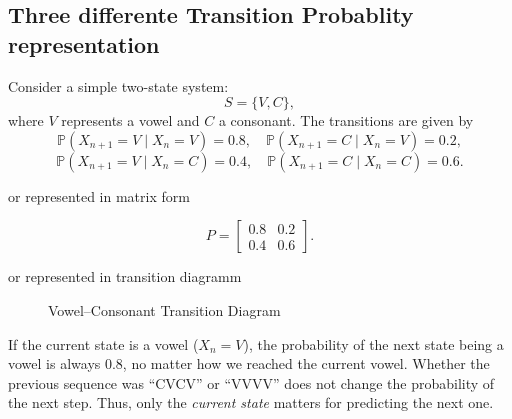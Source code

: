 \subsection{Three differente Transition Probablity representation}

Consider a simple two-state system:
\[
S = \{V, C\},
\]
where $V$ represents a vowel and $C$ a consonant. The transitions are given by
\[
\mathbb{P}(X_{n+1}=V \mid X_n=V) = 0.8, \quad
\mathbb{P}(X_{n+1}=C \mid X_n=V) = 0.2,
\]
\[
\mathbb{P}(X_{n+1}=V \mid X_n=C) = 0.4, \quad
\mathbb{P}(X_{n+1}=C \mid X_n=C) = 0.6.
\]

or represented in matrix form

\[
P =
\begin{bmatrix}
0.8 & 0.2 \\
0.4 & 0.6
\end{bmatrix}.
\]

or represented in transition diagramm
\begin{figure}[htbp]
\centering
{}
\caption{Vowel–Consonant Transition Diagram}
\label{fig:vowel-consonant-diagram}
\end{figure}

If the current state is a vowel ($X_n = V$), the probability of the next state being 
a vowel is always $0.8$, no matter how we reached the current vowel. Whether the 
previous sequence was ``CVCV'' or ``VVVV'' does not change the probability of the 
next step. Thus, only the \emph{current state} matters for predicting the next one.


